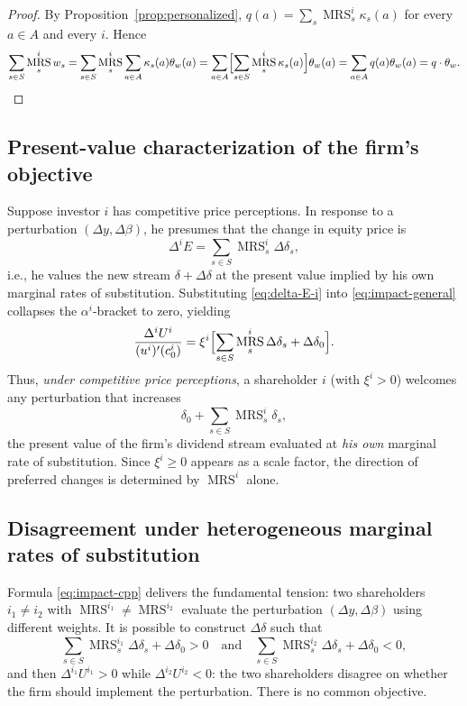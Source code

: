 \documentclass[11pt,a4paper,oneside]{book}
\def\geq{\geqslant}
\def\et{\quad \text{and} \quad}
\DeclareMathOperator{\MRS}{MRS}
\theoremstyle{plain}
\theoremstyle{definition}
\theoremstyle{remark}
\numberwithin{equation}{chapter}
\begin{document}
\begin{proof}
By Proposition~\ref{prop:personalized}, $q(a) = \sum_s \MRS^i_s \kappa_s(a)$ for every $a \in A$ and every $i$.
Hence
\begin{equation*}
  \sum_{s \in S} \MRS^i_s w_s
  = \sum_{s \in S} \MRS^i_s \sum_{a \in A} \kappa_s(a) \theta_w(a)
  = \sum_{a \in A} \Bigl[ \sum_{s \in S} \MRS^i_s \kappa_s(a) \Bigr] \theta_w(a)
  = \sum_{a \in A} q(a) \theta_w(a) = q \cdot \theta_w. \qedhere
\end{equation*}
\end{proof}

\subsection{Present-value characterization of the firm's objective}

Suppose investor $i$ has competitive price perceptions.
In response to a perturbation $(\Delta y, \Delta \beta)$, he presumes that the change in equity price is
\begin{equation}\label{eq:delta-E-i}
  \Delta^i E = \sum_{s \in S} \MRS^i_s \Delta \delta_s,
\end{equation}
i.e., he values the new stream $\delta + \Delta \delta$ at the present value implied by his own marginal rates of substitution.
Substituting \eqref{eq:delta-E-i} into \eqref{eq:impact-general} collapses the $\alpha^i$-bracket to zero, yielding
\begin{equation}\label{eq:impact-cpp}
  \frac{\Delta^i U^i}{(u^i)'(c^i_0)}
  = \xi^i \Bigl[ \sum_{s \in S} \MRS^i_s \Delta \delta_s + \Delta \delta_0 \Bigr].
\end{equation}
Thus, \emph{under competitive price perceptions}, a shareholder $i$ (with $\xi^i > 0$) welcomes any perturbation that increases
\begin{equation*}
  \delta_0 + \sum_{s \in S} \MRS^i_s \delta_s,
\end{equation*}
the present value of the firm's dividend stream evaluated at \emph{his own} marginal rate of substitution.
Since $\xi^i \geq 0$ appears as a scale factor, the direction of preferred changes is determined by $\MRS^i$ alone.

\subsection{Disagreement under heterogeneous marginal rates of substitution}

Formula \eqref{eq:impact-cpp} delivers the fundamental tension: two shareholders $i_1 \neq i_2$ with $\MRS^{i_1} \neq \MRS^{i_2}$ evaluate the perturbation $(\Delta y, \Delta \beta)$ using different weights.
It is possible to construct $\Delta \delta$ such that
\begin{equation*}
  \sum_{s \in S} \MRS^{i_1}_s \Delta \delta_s + \Delta \delta_0 > 0
  \et
  \sum_{s \in S} \MRS^{i_2}_s \Delta \delta_s + \Delta \delta_0 < 0,
\end{equation*}
and then $\Delta^{i_1} U^{i_1} > 0$ while $\Delta^{i_2} U^{i_2} < 0$: the two shareholders disagree on whether the firm should implement the perturbation.
There is no common objective.
\end{document}
